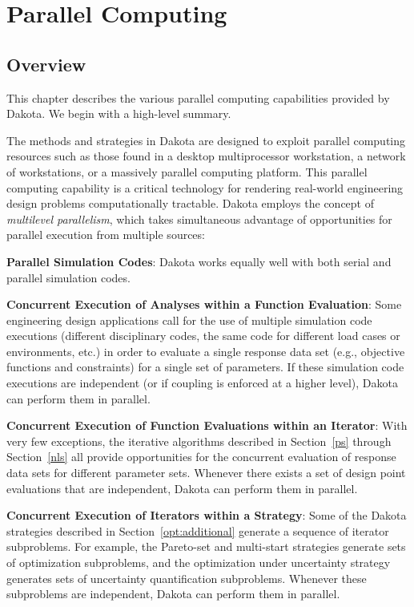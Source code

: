 \chapter{Parallel Computing}\label{parallel}

\section{Overview}\label{parallel:overview}

This chapter describes the various parallel computing capabilities
provided by Dakota.  We begin with a high-level summary.

The methods and strategies in Dakota are designed to exploit parallel
computing resources such as those found in a desktop multiprocessor
workstation, a network of workstations, or a massively parallel
computing platform. This parallel computing capability is a critical
technology for rendering real-world engineering design problems
computationally tractable. Dakota employs the concept of
\emph{multilevel parallelism}, which takes simultaneous advantage of
opportunities for parallel execution from multiple sources:

\textbf{Parallel Simulation Codes}: Dakota works equally well with both
serial and parallel simulation codes.

\textbf{Concurrent Execution of Analyses within a Function Evaluation}:
Some engineering design applications call for the use of multiple
simulation code executions (different disciplinary codes, the same
code for different load cases or environments, etc.) in order to
evaluate a single response data set (e.g., objective functions and
constraints) for a single set of parameters. If these simulation code
executions are independent (or if coupling is enforced at a higher
level), Dakota can perform them in parallel.

\textbf{Concurrent Execution of Function Evaluations within an Iterator}:
With very few exceptions, the iterative algorithms described in
Section~\ref{ps} through
Section~\ref{nls} all provide opportunities for the
concurrent evaluation of response data sets for different parameter
sets. Whenever there exists a set of design point evaluations that are
independent, Dakota can perform them in parallel.

\textbf{Concurrent Execution of Iterators within a Strategy}: Some of
the Dakota strategies described in Section~\ref{opt:additional}
generate a sequence of iterator subproblems. For example, the
Pareto-set and multi-start strategies generate sets of optimization
subproblems, and the optimization under uncertainty strategy generates
sets of uncertainty quantification subproblems. Whenever these
subproblems are independent, Dakota can perform them in parallel.

